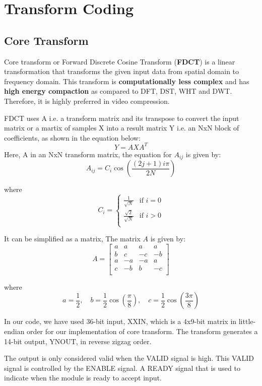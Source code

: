 \section{Transform Coding}

\subsection{Core Transform}
Core transform or Forward Discrete Cosine Transform (\textbf{FDCT}) is a linear transformation that transforms the given input data from spatial domain to frequency domain. This transform is \textbf{computationally less complex} and has \textbf{high energy compaction} as compared to DFT, DST, WHT and DWT. Therefore, it is highly preferred in video compression.

FDCT uses A i.e. a transform matrix and its transpose to convert the input matrix or a martix of samples X into a result matrix Y i.e. an NxN block of coefficients, as shown in the equation below:
\begin{equation}
	Y = AXA^{T}
\end{equation}
Here, A in an NxN transform matrix, the equation for $A_{ij}$ is given by:
\[
A_{ij} = C_i \cos\left(\frac{(2j + 1)i\pi}{2N}\right)
\]

where
\[
C_i = \begin{cases} 
	\frac{1}{\sqrt{N}} & \text{if } i = 0 \\
	\frac{\sqrt{2}}{\sqrt{N}} & \text{if } i > 0 \\
\end{cases}
\]

It can be simplified as a matrix, The matrix $A$ is given by:
\[
A = \begin{bmatrix}
	a & a & a & a \\
	b & c & -c & -b \\
	a & -a & -a & a \\
	c & -b & b & -c \\
\end{bmatrix}
\]

where
\[
a = \frac{1}{2}, \quad
b = \frac{1}{2}\cos\left(\frac{\pi}{8}\right), \quad
c = \frac{1}{2}\cos\left(\frac{3\pi}{8}\right)
\]

In our code, we have used 36-bit input, XXIN, which is a 4x9-bit matrix in little-endian order for our implementation of core transform. The transform generates a 14-bit output, YNOUT, in reverse zigzag order.

The output is only considered valid when the VALID signal is high. This VALID signal is controlled by the ENABLE signal. A READY signal that is used to indicate when the module is ready to accept input.

